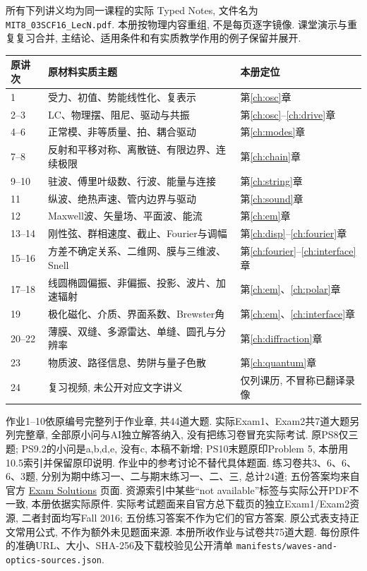 所有下列讲义均为同一课程的实际 Typed Notes, 文件名为 \texttt{MIT8\_03SCF16\_LecN.pdf}. 本册按物理内容重组, 不是每页逐字镜像. 课堂演示与重复复习合并, 主结论、适用条件和有实质教学作用的例子保留并展开.
\begin{longtable}{p{.12\linewidth}p{.39\linewidth}p{.36\linewidth}}
\toprule 原讲次 & 原材料实质主题 & 本册定位\\\midrule\endhead
1 & 受力、初值、势能线性化、复表示 & 第\ref{ch:osc}章\\
2--3 & LC、物理摆、阻尼、驱动与共振 & 第\ref{ch:osc}--\ref{ch:drive}章\\
4--6 & 正常模、非等质量、拍、耦合驱动 & 第\ref{ch:modes}章\\
7--8 & 反射和平移对称、离散链、有限边界、连续极限 & 第\ref{ch:chain}章\\
9--10 & 驻波、傅里叶级数、行波、能量与连接 & 第\ref{ch:string}章\\
11 & 纵波、绝热声速、管内边界与驱动 & 第\ref{ch:sound}章\\
12 & Maxwell波、矢量场、平面波、能流 & 第\ref{ch:em}章\\
13--14 & 刚性弦、群相速度、截止、Fourier与调幅 & 第\ref{ch:disp}--\ref{ch:fourier}章\\
15--16 & 方差不确定关系、二维网、膜与三维波、Snell & 第\ref{ch:fourier}--\ref{ch:interface}章\\
17--18 & 线圆椭圆偏振、非偏振、投影、波片、加速辐射 & 第\ref{ch:em}、\ref{ch:polar}章\\
19 & 极化磁化、介质、界面系数、Brewster角 & 第\ref{ch:em}、\ref{ch:interface}章\\
20--22 & 薄膜、双缝、多源雷达、单缝、圆孔与分辨率 & 第\ref{ch:diffraction}章\\
23 & 物质波、路径信息、势阱与量子色散 & 第\ref{ch:quantum}章\\
24 & 复习视频, 未公开对应文字讲义 & 仅列课历, 不冒称已翻译录像\\\bottomrule
\end{longtable}

作业1--10依原编号完整列于作业章, 共44道大题. 实际Exam1、Exam2共7道大题另列完整章, 全部原小问与AI独立解答纳入, 没有把练习卷冒充实际考试. 原PS8仅三题; PS9.2的小问是a,b,d,e, 没有c, 本稿不新增; PS10末题原印Problem 5, 本册用10.5索引并保留原印说明. 作业中的参考讨论不替代具体题面. 练习卷共3、6、6、6、3题, 分别为期中练习一、二与期末练习一、二、三, 总计24道; 五份答案均来自官方 \href{https://ocw.mit.edu/courses/8-03sc-physics-iii-vibrations-and-waves-fall-2016/resources/exam-solutions/}{Exam Solutions} 页面. 资源索引中某些“not available”标签与实际公开PDF不一致, 本册依据实际原件. 实际考试题面来自官方总下载页的独立Exam1/Exam2资源, 二者封面均写Fall 2016; 五份练习答案不作为它们的官方答案. 原公式表支持正文常用公式, 不作为额外未见题面来源. 本册所收作业与试卷共75道大题. 每份原件的准确URL、大小、SHA-256及下载校验见公开清单 \texttt{manifests/waves-and-optics-sources.json}.

